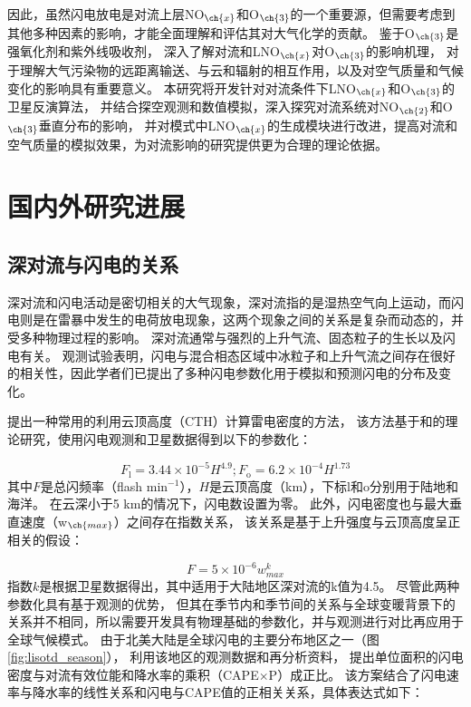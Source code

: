 因此，虽然闪电放电是对流上层NO$_{\ch{x}}$和O$_{\ch{3}}$的一个重要源，但需要考虑到其他多种因素的影响，才能全面理解和评估其对大气化学的贡献。
鉴于O$_{\ch{3}}$是强氧化剂和紫外线吸收剂\citep{Myhre.2013}，
深入了解对流和LNO$_{\ch{x}}$对O$_{\ch{3}}$的影响机理，
对于理解大气污染物的远距离输送、与云和辐射的相互作用，以及对空气质量和气候变化的影响具有重要意义。
本研究将开发针对对流条件下LNO$_{\ch{x}}$和O$_{\ch{3}}$的卫星反演算法，
并结合探空观测和数值模拟，深入探究对流系统对NO$_{\ch{2}}$和O$_{\ch{3}}$垂直分布的影响，
并对模式中LNO$_{\ch{x}}$的生成模块进行改进，提高对流和空气质量的模拟效果，为对流影响的研究提供更为合理的理论依据。


\section{国内外研究进展}

\subsection{深对流与闪电的关系} \label{sec:lightning_convection}

深对流和闪电活动是密切相关的大气现象，深对流指的是湿热空气向上运动，而闪电则是在雷暴中发生的电荷放电现象，这两个现象之间的关系是复杂而动态的，并受多种物理过程的影响。
深对流通常与强烈的上升气流、固态粒子的生长以及闪电有关。
观测试验表明，闪电与混合相态区域中冰粒子和上升气流之间存在很好的相关性\citep{Williams.1989,Deierling.2008c,Deierling.2008d}，因此学者们已提出了多种闪电参数化用于模拟和预测闪电的分布及变化。

\citet{Price.1992}提出一种常用的利用云顶高度（CTH）计算雷电密度的方法，
该方法基于\citet{Vonnegut.1963}和\citet{Williams.1985}的理论研究，使用闪电观测和卫星数据得到以下的参数化：

\begin{equation} \label{eq:ltng_cth}
F_\mathrm{l} = 3.44\times10^{-5}H^{4.9};
F_\mathrm{o} = 6.2\times10^{-4}H^{1.73}
\end{equation}
其中$F$是总闪频率（flash min$^{-1}$），$H$是云顶高度（km），下标l和o分别用于陆地和海洋。
在云深小于5 km的情况下，闪电数设置为零。
此外，闪电密度也与最大垂直速度（w$_{\ch{max}}$）之间存在指数关系，
该关系是基于上升强度与云顶高度呈正相关的假设：

\begin{equation} \label{eq:ltng_w}
F = 5\times10^{-6}w^{k}_{max}
\end{equation}
指数$k$是根据卫星数据得出，其中适用于大陆地区深对流的k值为4.5\citep{Price.1992}。
尽管此两种参数化具有基于观测的优势，
但其在季节内和季节间的关系与全球变暖背景下的关系并不相同，所以需要开发具有物理基础的参数化，并与观测进行对比再应用于全球气候模式。
由于北美大陆是全球闪电的主要分布地区之一（图\ref{fig:lisotd_season}），
\citet{Romps.2014}利用该地区的观测数据和再分析资料，
提出单位面积的闪电密度与对流有效位能和降水率的乘积（CAPE$\times$P）成正比。
该方案结合了闪电速率与降水率的线性关系\citep{Battan.1965,Petersen.1998,Tapia.1998}和闪电与CAPE值的正相关关系\citep{Williams.2005a}，具体表达式如下：

